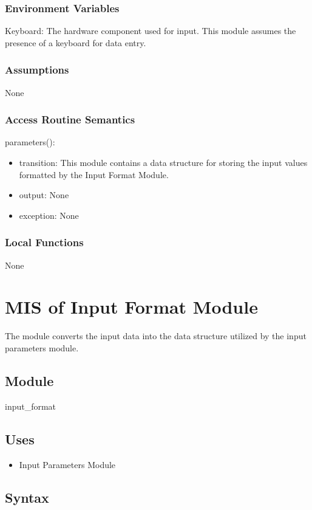 \documentclass[12pt, titlepage]{article}
\begin{document}
\subsubsection{Environment Variables}
Keyboard: The hardware component used for input. This module assumes the presence of a keyboard for data entry.

\subsubsection{Assumptions}

None

\subsubsection{Access Routine Semantics}

parameters():
\begin{itemize}
\item transition: This module contains a data structure for storing the input values formatted by the Input Format Module.
\item output: None
\item exception: None
\end{itemize}

\subsubsection{Local Functions}
None
\newpage

\section{MIS of Input Format Module}
The module converts the input data into the data structure utilized by the input parameters module.

\subsection{Module}
input\_format

\subsection{Uses}
\begin{itemize}
    \item Input Parameters Module
\end{itemize}

\subsection{Syntax}
\end{document}
